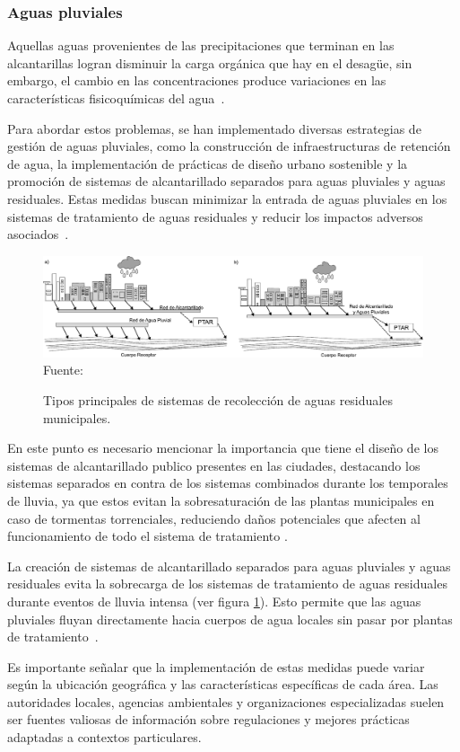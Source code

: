 \subsubsection{Aguas pluviales}
Aquellas aguas provenientes de las precipitaciones que terminan en las alcantarillas logran disminuir la carga orgánica que hay en el desagüe, sin embargo, el cambio en las concentraciones produce variaciones en las características fisicoquímicas del agua~\citep{lazcano2016}.\par
Para abordar estos problemas, se han implementado diversas estrategias de gestión de aguas pluviales, como la construcción de infraestructuras de retención de agua, la implementación de prácticas de diseño urbano sostenible y la promoción de sistemas de alcantarillado separados para aguas pluviales y aguas residuales. Estas medidas buscan minimizar la entrada de aguas pluviales en los sistemas de tratamiento de aguas residuales y reducir los impactos adversos asociados~\citep{EPA}.\par
\begin{figure}[H]
	\centering
	\includegraphics[scale=0.45]{../Images/Sewage_systems.pdf}
	\\\small{Fuente: \cite{Sperling2007}}
	\caption{Tipos principales de sistemas de recolección de aguas residuales municipales.}\label{fig:swgstm}
\end{figure}
En este punto es necesario mencionar la importancia que tiene el diseño de los sistemas de alcantarillado publico presentes en las ciudades, destacando los sistemas separados en contra de los sistemas combinados durante los temporales de lluvia, ya que estos evitan la sobresaturación de las plantas municipales en caso de tormentas torrenciales, reduciendo daños potenciales que afecten al funcionamiento de todo el sistema de tratamiento \citep{Sperling2007}.\par
La creación de sistemas de alcantarillado separados para aguas pluviales y aguas residuales evita la sobrecarga de los sistemas de tratamiento de aguas residuales durante eventos de lluvia intensa (ver figura \ref{fig:swgstm}). Esto permite que las aguas pluviales fluyan directamente hacia cuerpos de agua locales sin pasar por plantas de tratamiento~\citep{WEF}.\par
Es importante señalar que la implementación de estas medidas puede variar según la ubicación geográfica y las características específicas de cada área. Las autoridades locales, agencias ambientales y organizaciones especializadas suelen ser fuentes valiosas de información sobre regulaciones y mejores prácticas adaptadas a contextos particulares.\par
